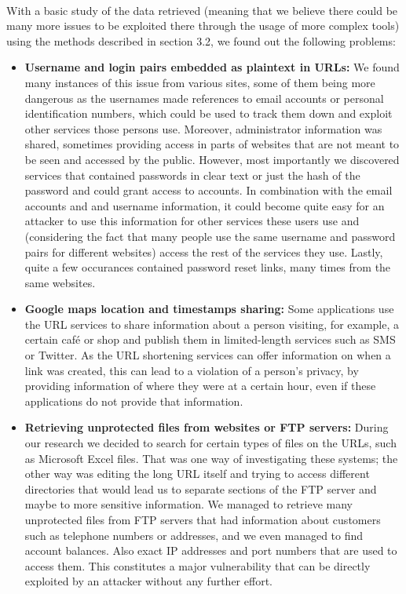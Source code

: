 \documentclass[12pt]{article}
\begin{document}
\paragraph{}
With a basic study of the data retrieved (meaning that we believe there could be many more issues to be exploited there through the usage of more complex tools) using the methods described in section 3.2, we found out the following problems:

\begin{itemize}

\item \textbf{Username and login pairs embedded as plaintext in URLs:} We found many instances of this issue from various sites, some of them being more dangerous as the usernames made references to email accounts or personal identification numbers, which could be used to track them down and exploit other services those persons use. Moreover, administrator information was shared, sometimes providing access in parts of websites that are not meant to be seen and accessed by the public. However, most importantly we discovered services that contained passwords in clear text or just the hash of the password and could grant access to accounts. In combination with the email accounts and and username information, it could become quite easy for an attacker to use this information for other services these users use and (considering the fact that many people use the same username and password pairs for different websites) access the rest of the services they use. Lastly, quite a few occurances contained password reset links, many times from the same websites.

\item \textbf{Google maps location and timestamps sharing:} Some applications use the URL services to share information about a person visiting, for example, a certain café or shop and publish them in limited-length services such as SMS or Twitter. As the URL shortening services can offer information on when a link was created, this can lead to a violation of a person's privacy, by providing information of where they were at a certain hour, even if these applications do not provide that information.

\item \textbf{Retrieving unprotected files from websites or FTP servers:} During our research we decided to search for certain types of files on the URLs, such as Microsoft Excel files. That was one way of investigating these systems; the other way was editing the long URL itself and trying to access different directories that would lead us to separate sections of the FTP server and maybe to more sensitive information. We managed to retrieve many unprotected files from FTP servers that had information about customers such as telephone numbers or addresses, and we even managed to find account balances. Also exact IP addresses and port numbers that are used to access them. This constitutes a major vulnerability that can be directly exploited by an attacker without any further effort.


\end{itemize}
\end{document}
